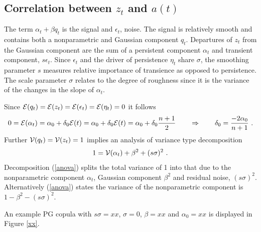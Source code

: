 \documentclass[authoryear]{elsarticle}
\newcommand{\cov}{\mathrm{cov}}
\newcommand{\eps}{\epsilon}
\newcommand{\Ex}{{\cal E}}
\newcommand{\eref}[1]{(\ref{#1})}
\newcommand{\fref}[1]{Figure \ref{#1}}
\newcommand{\cq}{\ , \qquad}
\newcommand{\Vx}{{\cal V}}
\newcommand{\be}[1]{\begin{equation}\label{#1}}
\newcommand{\ee}{\end{equation}}
\begin{document}
\subsection{Correlation between $z_t$ and $a(t)$}


 
 
 
 
 The term $\alpha_t+\beta q_t$ is the signal and $\eps_t$, noise.    The signal is relatively smooth and contains both a nonparametric and Gaussian component $q_t$.   Departures of $z_t$ from the Gaussian component  are the sum of a persistent component $\alpha_t$ and  transient component, $s\eps_t$.  Since  $\eps_t$ and  the driver of persistence $\eta_t$  share $\sigma$, the smoothing parameter $s$ measures relative importance of transience as opposed to persistence.   The scale parameter $\sigma$ relates to the degree of roughness since it is the variance of the changes in the  slope of $\alpha_t$.
 

 
  Since $\Ex(q_t)=\Ex(z_t)=\Ex(\eps_t)=\Ex(\eta_t)=0$ it follows  
 $$
0= \Ex(\alpha_t)=\alpha_0+\delta_0 \Ex(t) = \alpha_0+\delta_0 \Ex(t) = \alpha_0+\delta_0 \frac{n+1}{2}\qquad\Rightarrow\qquad \delta_0 = \frac{-2\alpha_0}{n+1}\ .
 $$ 
Further $\Vx(q_t)=\Vx(z_t)=1$ implies an analysis of variance type decomposition
\be{anova}
 1= \Vx(\alpha_t) + \beta^2 + (s\sigma)^2\ .
\ee
Decomposition \eref{anova} splits the total variance  of 1 into that due to the nonparametric component $\alpha_t$,  Gaussian component $\beta^2$ and residual noise, $(s\sigma)^2$.  Alternatively \eref{anova} states the variance of the nonparametric component is $1-\beta^2-(s\sigma)^2$.

An example PG copula with $s\sigma=xx$, $\sigma=0$, $\beta=xx$ and $\alpha_0=xx$  is displayed in \fref{xx}.  

 
 
\end{document}
